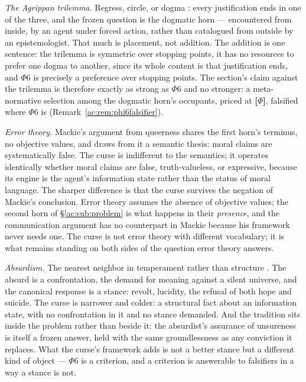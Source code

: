 \documentclass[11pt]{article}
\numberwithin{equation}{section}
\theoremstyle{plain}
\theoremstyle{definition}
\theoremstyle{remark}
\begin{document}
\emph{The Agrippan trilemma.} Regress, circle, or dogma \cite{Sextus}: every justification ends in one of the three, and the frozen question is the dogmatic horn --- encountered from inside, by an agent under forced action, rather than catalogued from outside by an epistemologist. That much is placement, not addition. The addition is one sentence: the trilemma is symmetric over stopping points, it has no resources to prefer one dogma to another, since its whole content is that justification ends, and $\Phi6$ is precisely a preference over stopping points. The section's claim against the trilemma is therefore exactly as strong as $\Phi6$ and no stronger: a meta-normative selection among the dogmatic horn's occupants, priced at \textbf{[$\Phi$]}, falsified where $\Phi6$ is (Remark~\ref{ac:rem:phi6falsifier}).

\emph{Error theory.} Mackie's argument from queerness \cite{Mackie77} shares the first horn's terminus, no objective values, and draws from it a semantic thesis: moral claims are systematically false. The curse is indifferent to the semantics; it operates identically whether moral claims are false, truth-valueless, or expressive, because its engine is the agent's information state rather than the status of moral language. The sharper difference is that the curse survives the negation of Mackie's conclusion. Error theory assumes the absence of objective values; the second horn of \S\ref{ac:sub:problem} is what happens in their \emph{presence}, and the communication argument has no counterpart in Mackie because his framework never needs one. The curse is not error theory with different vocabulary; it is what remains standing on both sides of the question error theory answers.

\emph{Absurdism.} The nearest neighbor in temperament rather than structure \cite{Camus42}. The absurd is a confrontation, the demand for meaning against a silent universe, and the canonical response is a stance: revolt, lucidity, the refusal of both hope and suicide. The curse is narrower and colder: a structural fact about an information state, with no confrontation in it and no stance demanded. And the tradition sits inside the problem rather than beside it: the absurdist's assurance of unsureness is itself a frozen answer, held with the same groundlessness as any conviction it replaces. What the curse's framework adds is not a better stance but a different kind of object --- $\Phi6$ is a criterion, and a criterion is answerable to falsifiers in a way a stance is not.
\end{document}
